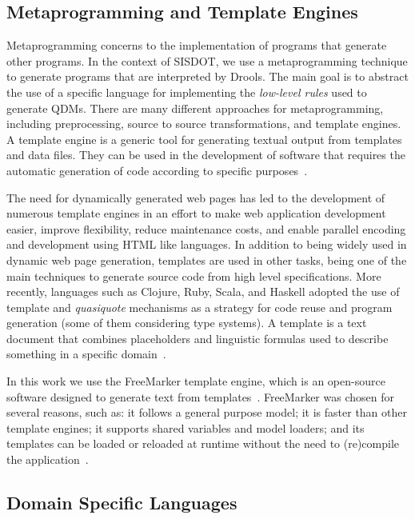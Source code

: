 \subsection{Metaprogramming and Template Engines}

Metaprogramming concerns to the implementation of programs that 
generate other programs. In the context of SISDOT, we use a metaprogramming 
technique to generate programs that are interpreted by Drools. The main goal 
is to abstract the use of a specific language for implementing the 
\emph{low-level rules} used to generate QDMs. There are many different 
approaches for metaprogramming, including preprocessing, source to source 
transformations, and template engines. 
A template engine is a generic tool for generating textual output from templates and data 
files. They can be used 
in the development of software that requires the automatic generation of code 
according to specific purposes~\cite{benato2017}. 

The need for dynamically generated web pages has led to the development of numerous template engines 
in an effort to make web application development easier, improve flexibility, 
reduce maintenance costs, and enable parallel encoding and development using HTML like languages. 
In addition to being widely used in dynamic web page generation, templates are used in other tasks, 
being one of the main techniques to generate source code from high level specifications. More 
recently, languages such as Clojure, Ruby, Scala, and Haskell adopted the use of template and \emph{quasiquote} 
mechanisms as a strategy for code reuse and program generation (some of them considering type systems).
A template is a text document that 
combines placeholders and linguistic formulas used to describe something in a specific domain~\cite{segura2017}. 

In this work we use the FreeMarker template engine, which is an open-source software designed to 
generate text from templates~\cite{radjenovic2009}. FreeMarker was chosen for several reasons, 
such as: it follows a general purpose model; it is faster than other template engines; it supports 
shared variables and model loaders; and its templates can be loaded or reloaded at runtime without the 
need to (re)compile the application~\cite{benato2017,parr2006}.

\subsection{Domain Specific Languages}

